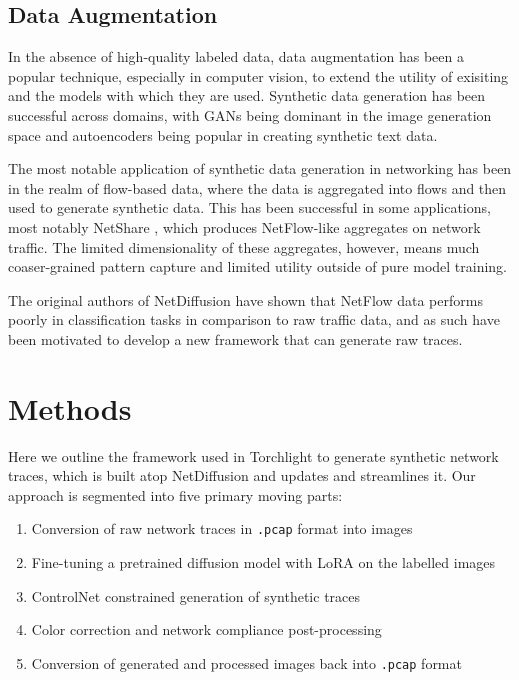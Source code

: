 \documentclass[acmsmall, nonacm]{acmart}
\begin{document}
\subsection{Data Augmentation}
In the absence of high-quality labeled data, data augmentation has been a popular
technique, especially in computer vision, to extend the utility of exisiting
and the models with which they are used. Synthetic data generation has been
successful across domains, with GANs being dominant in the image generation space
and autoencoders being popular in creating synthetic text data. 

The most notable application of synthetic data generation in networking has been
in the realm of flow-based data, where the data is aggregated into flows and then
used to generate synthetic data. This has been successful in some applications, 
most notably NetShare \cite{NetShare}, which produces NetFlow-like aggregates 
on network traffic. The limited dimensionality of these aggregates, however, 
means much coaser-grained pattern capture and limited utility outside of 
pure model training.

The original authors of NetDiffusion \cite{Jiang2024} have shown that
NetFlow data performs poorly in classification tasks in comparison to raw 
traffic data, and as such have been motivated to develop a new framework
that can generate raw traces.

\section{Methods}
Here we outline the framework used in Torchlight to generate synthetic network traces,
which is built atop NetDiffusion \cite{Jiang2024} and updates and streamlines it.
Our approach is segmented into five primary moving parts:

\begin{enumerate}
  \item Conversion of raw network traces in \verb|.pcap| format into images
  \item Fine-tuning a pretrained diffusion model with LoRA on the labelled images
  \item ControlNet constrained generation of synthetic traces
  \item Color correction and network compliance post-processing
  \item Conversion of generated and processed images back into \verb|.pcap| format
\end{enumerate}
\end{document}
